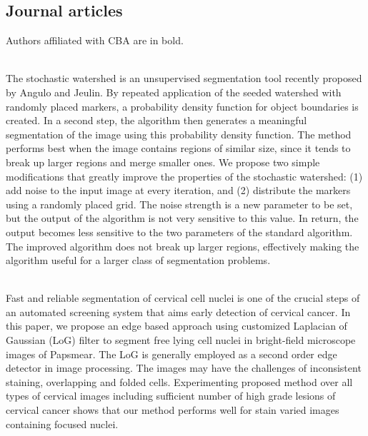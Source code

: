 {\subsection{Journal articles}\label{sect:journal}
%
\vspace*{-0.3mm}
Authors affiliated with CBA are in bold.
{\small
\vspace*{-0.5mm}
\begin{enumerate}
\\ \aabstract
The stochastic watershed is an unsupervised segmentation tool recently proposed by Angulo and Jeulin. By repeated application of the seeded watershed with randomly placed markers, a probability density function for object boundaries is created. In a second step, the algorithm then generates a meaningful segmentation of the image using this probability density function. The method performs best when the image contains regions of similar size, since it tends to break up larger regions and merge smaller ones. We propose two simple modifications that greatly improve the properties of the stochastic watershed: (1) add noise to the input image at every iteration, and (2) distribute the markers using a randomly placed grid. The noise strength is a new parameter to be set, but the output of the algorithm is not very sensitive to this value. In return, the output becomes less sensitive to the two parameters of the standard algorithm. The improved algorithm does not break up larger regions, effectively making the algorithm useful for a larger class of segmentation problems.


\\ \aabstract
Fast and reliable segmentation of cervical cell nuclei is one of the crucial steps of an automated screening system that aims early detection of cervical cancer. In this paper, we propose an edge based approach using customized Laplacian of Gaussian (LoG) filter to segment free lying cell nuclei in bright-field microscope images of Papsmear. The LoG is generally employed as a second order edge detector in image processing. The images may have the challenges of inconsistent staining, overlapping and folded cells. Experimenting proposed method over all types of cervical images including sufficient number of high grade lesions of cervical cancer shows that our method performs well for stain varied images containing focused nuclei.



\end{enumerate}}}
